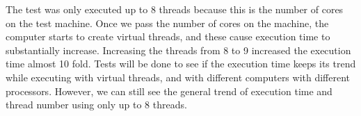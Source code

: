 \documentclass[CheckpointReport.tex]{subfiles}
\begin{document}
The test was only executed up to 8 threads because this is the number of cores on the test machine.  Once we pass the number of cores on the machine, the computer starts to create virtual threads, and these cause execution time to substantially increase.  Increasing the threads from 8 to 9 increased the execution time almost 10 fold.  Tests will be done to see if the execution time keeps its trend while executing with virtual threads, and with different computers with different processors.  However, we can still see the general trend of execution time and thread number using only up to 8 threads.  
\end{document}
